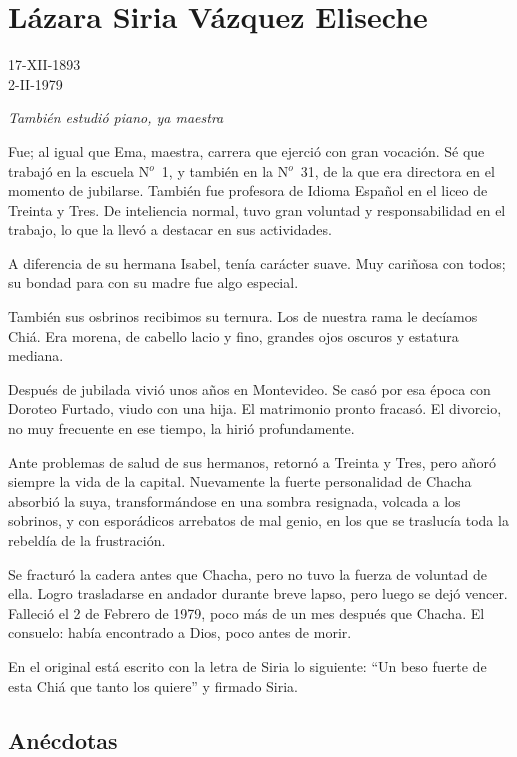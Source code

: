 \documentclass{article}
\begin{document}
\section{Lázara Siria Vázquez Eliseche}

17-XII-1893\\
2-II-1979

\emph{También estudió piano, ya maestra}

Fue; al igual que Ema, maestra, carrera que ejerció con gran vocación. Sé que trabajó en la escuela N$^o$~1, y también en la N$^o$~31, de la que era directora en el momento de jubilarse. También fue profesora de Idioma Español en el liceo de Treinta y Tres. De inteliencia normal, tuvo gran voluntad y responsabilidad en el trabajo, lo que la llevó a destacar en sus actividades.

A diferencia de su hermana Isabel, tenía carácter suave. Muy cariñosa con todos; su bondad para con su madre fue algo especial.

También sus osbrinos recibimos su ternura. Los de nuestra rama le decíamos Chiá. Era morena, de cabello lacio y fino, grandes ojos oscuros y estatura mediana.

Después de jubilada vivió unos años en Montevideo. Se casó por esa época con Doroteo Furtado, viudo con una hija. El matrimonio pronto fracasó. El divorcio, no muy frecuente en ese tiempo, la hirió profundamente.

Ante problemas de salud de sus hermanos, retornó a Treinta y Tres, pero añoró siempre la vida de la capital. Nuevamente la fuerte personalidad de Chacha absorbió la suya, transformándose en una sombra resignada, volcada a los sobrinos, y con esporádicos arrebatos de mal genio, en los que se traslucía toda la rebeldía de la frustración.

Se fracturó la cadera antes que Chacha, pero no tuvo la fuerza de voluntad de ella. Logro trasladarse en andador durante breve lapso, pero luego se dejó vencer. Falleció el 2 de Febrero de 1979, poco más de un mes después que Chacha. El consuelo: había encontrado a Dios, poco antes de morir.

En el original está escrito con la letra de Siria lo siguiente: ``Un beso fuerte de esta Chiá que tanto los quiere'' y firmado Siria.

\subsection{Anécdotas}
\end{document}
